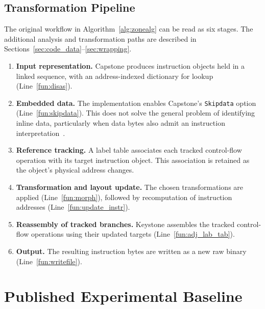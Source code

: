 \documentclass[runningheads]{llncs}
\newif\ifworkingdraft
\newcommand{\draftnote}[1]{\ifworkingdraft\par\smallskip\noindent
 {\color{draftblue}\small\textbf{Draft note.} #1}\par\smallskip\fi}
\begin{document}
\subsection{Transformation Pipeline}
The original workflow in Algorithm~\ref{alg:zonealg} can be read as six stages. The additional analysis and transformation paths are described in Sections~\ref{sec:code_data}--\ref{sec:wrapping}.

\begin{enumerate}
\item \textbf{Input representation.}
    Capstone produces instruction objects held in a linked sequence, with an address-indexed dictionary for lookup (Line~\ref{fun:disas}).

\item \textbf{Embedded data.}
    The implementation enables Capstone's \texttt{Skipdata} option (Line~\ref{fun:skipdata}). This does not solve the general problem of identifying inline data, particularly when data bytes also admit an instruction interpretation~\cite{bin2binobf}.

\item \textbf{Reference tracking.}
    A label table associates each tracked control-flow operation with its target instruction object. This association is retained as the object's physical address changes.

\item \textbf{Transformation and layout update.}
    The chosen transformations are applied (Line~\ref{fun:morph}), followed by recomputation of instruction addresses (Line~\ref{fun:update_instr}).

\item \textbf{Reassembly of tracked branches.}
    Keystone assembles the tracked control-flow operations using their updated targets (Line~\ref{fun:adj_lab_tab}).

\item \textbf{Output.}
    The resulting instruction bytes are written as a new raw binary (Line~\ref{fun:writefile}).

\end{enumerate}

\section{Published Experimental Baseline}\label{sec:results}
\draftnote{Historical detection-plot associations and similarity provenance
still require reconciliation with the conference records
(\texttt{BASELINE\_CHECKS.md}). Working rates are consolidated in
Table~\ref{tab:overall_working_update} using the retained test records.}
\end{document}
